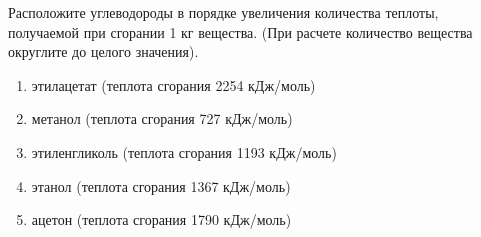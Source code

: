 
Расположите углеводороды
в порядке увеличения количества теплоты, получаемой при сгорании 1 кг вещества.
(При расчете количество вещества округлите до целого значения).

\begin{enumerate}
    \item этилацетат (теплота сгорания 2254 кДж/моль)
    \item метанол (теплота сгорания 727 кДж/моль)
    \item этиленгликоль (теплота сгорания 1193 кДж/моль)
    \item этанол (теплота сгорания 1367 кДж/моль)
    \item ацетон (теплота сгорания 1790 кДж/моль)
\end{enumerate}



